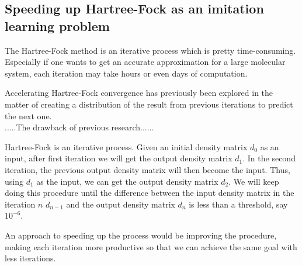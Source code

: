 \documentclass[twoside]{article}
\begin{document}
\subsection{Speeding up Hartree-Fock as an imitation learning problem}

The Hartree-Fock method is an iterative process which is pretty time-consuming. Especially if one wants to get an accurate approximation for a large molecular system, each iteration may take  hours or even days of computation. 

Accelerating Hartree-Fock convergence has previously been explored in the matter of creating a distribution of the result from previous iterations to predict the next one\cite{Pulay1980}.  \\

.....The drawback of previous research......







Hartree-Fock is an iterative process. Given an initial density matrix $d_0$ as an input, after first iteration we will get the output density matrix $d_1$. In the second iteration, the previous output density matrix will then become the input. Thus, using $d_1$ as the input, we can get the output density matrix $d_2$. We will keep doing this procedure until the difference between the input density matrix in the iteration $n$ $d_{n-1}$  and the output density matrix $d_n$ is less than a threshold, say $10^{-6}$. 

An approach to speeding up the process would be improving the procedure, making each iteration more productive so that we can achieve the same goal with less iterations. 
\end{document}
